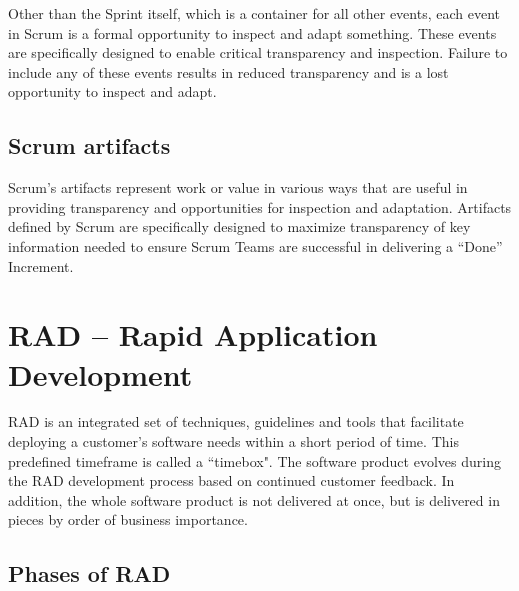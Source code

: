 Other than the Sprint itself, which is a container for all other events, each event in Scrum is a formal opportunity to inspect and adapt something. These events are specifically designed to enable critical transparency and inspection. Failure to include any of these events results in reduced transparency and is a lost opportunity to inspect and adapt.

\subsection{Scrum artifacts}

Scrum’s artifacts represent work or value in various ways that are useful in providing transparency and opportunities for inspection and adaptation. Artifacts defined by Scrum are specifically designed to maximize transparency of key information needed to ensure Scrum Teams are successful in delivering a “Done” Increment.

\section{RAD -- Rapid Application Development}

RAD is an integrated set of techniques, guidelines and tools that facilitate deploying a customer's software needs within a short period of time. This predefined timeframe is called a ``timebox". The software product evolves during the RAD development process based on continued customer feedback. In addition, the whole software product is not delivered at once, but is delivered in pieces by order of business importance.

\subsection{Phases of RAD}

